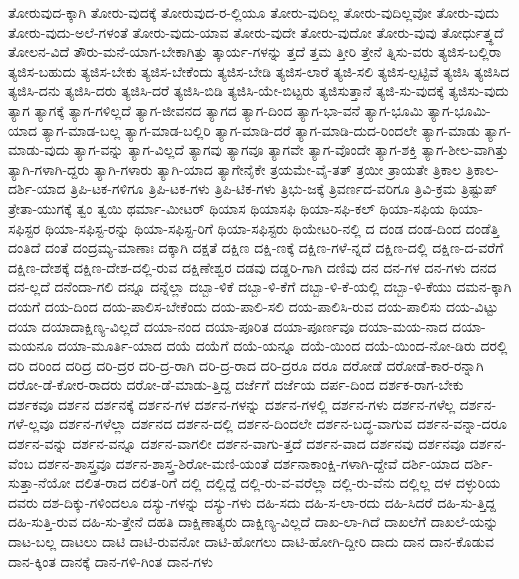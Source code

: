 {ತೋರುವುದ-ಕ್ಕಾಗಿ
ತೋರು-ವುದಕ್ಕೆ
ತೋರುವುದ-ರ-ಲ್ಲಿಯೂ
ತೋರು-ವುದಿಲ್ಲ
ತೋರು-ವುದಿಲ್ಲವೋ
ತೋರು-ವುದು
ತೋರು-ವುದು-ಅಲೆ-ಗಳಂತೆ
ತೋರು-ವುದು-ಯಾವ
ತೋರು-ವುದೇ
ತೋರು-ವುದೋ
ತೋರು-ವುವು
ತೋರ್ಧುತ್ತ್ಧದೆ
ತೋಲನ-ವಿದೆ
ತೌರು-ಮನೆ-ಯಾಗ-ಬೇಕಾಗಿತ್ತು
ತ್ಕಾರ್ಯ-ಗಳನ್ನು
ತ್ತದೆ
ತ್ತಮ
ತ್ತೀರಿ
ತ್ತೇನೆ
ತ್ನಿಸು-ವರು
ತ್ಯಜಿಸ-ಬಲ್ಲಿರಾ
ತ್ಯಜಿಸ-ಬಹುದು
ತ್ಯಜಿಸ-ಬೇಕು
ತ್ಯಜಿಸ-ಬೇಕೆಂದು
ತ್ಯಜಿಸ-ಬೇಡಿ
ತ್ಯಜಿಸ-ಲಾರೆ
ತ್ಯಜಿ-ಸಲಿ
ತ್ಯಜಿಸ-ಲ್ಪಟ್ಟಿವೆ
ತ್ಯಜಿಸಿ
ತ್ಯಜಿಸಿದ
ತ್ಯಜಿಸಿ-ದನು
ತ್ಯಜಿಸಿ-ದರು
ತ್ಯಜಿಸಿ-ದರೆ
ತ್ಯಜಿಸಿ-ಬಿಡಿ
ತ್ಯಜಿಸಿ-ಯೇ-ಬಿಟ್ಟರು
ತ್ಯಜಿಸುತ್ತಾನೆ
ತ್ಯಜಿ-ಸು-ವುದಕ್ಕೆ
ತ್ಯಜಿಸು-ವುದು
ತ್ಯಾಗ
ತ್ಯಾಗಕ್ಕೆ
ತ್ಯಾಗ-ಗಳಿಲ್ಲದೆ
ತ್ಯಾಗ-ಜೀವನದ
ತ್ಯಾಗದ
ತ್ಯಾಗ-ದಿಂದ
ತ್ಯಾಗ-ಭಾ-ವನೆ
ತ್ಯಾಗ-ಭೂಮಿ
ತ್ಯಾಗ-ಭೂಮಿ-ಯಾದ
ತ್ಯಾಗ-ಮಾಡ-ಬಲ್ಲ
ತ್ಯಾಗ-ಮಾಡ-ಬಲ್ಲಿರಿ
ತ್ಯಾಗ-ಮಾಡಿ-ದರೆ
ತ್ಯಾಗ-ಮಾಡಿ-ದುದ-ರಿಂದಲೇ
ತ್ಯಾಗ-ಮಾಡು
ತ್ಯಾಗ-ಮಾಡು-ವುದು
ತ್ಯಾಗ-ವನ್ನು
ತ್ಯಾಗ-ವಿಲ್ಲದೆ
ತ್ಯಾಗವು
ತ್ಯಾಗವೂ
ತ್ಯಾಗವೇ
ತ್ಯಾಗ-ವೊಂದೇ
ತ್ಯಾಗ-ಶಕ್ತಿ
ತ್ಯಾಗ-ಶೀಲ-ವಾಗಿತ್ತು
ತ್ಯಾಗಿ-ಗಳಾಗಿ-ದ್ದರು
ತ್ಯಾಗಿ-ಗಳಾರು
ತ್ಯಾಗಿ-ಯಾದ
ತ್ಯಾಗೇನೈಕೇ
ತ್ರಯಮೇ-ವೈ-ತತ್
ತ್ರಯೀ
ತ್ರಾಯತೇ
ತ್ರಿಕಾಲ
ತ್ರಿಕಾಲ-ದರ್ಶಿ-ಯಾದ
ತ್ರಿಪಿ-ಟಕ-ಗಳಿಗೂ
ತ್ರಿಪಿ-ಟಕ-ಗಳು
ತ್ರಿಪಿ-ಟಿಕ-ಗಳು
ತ್ರಿಭು-ಜಕ್ಕೆ
ತ್ರಿವರ್ಣದ-ವರಿಗೂ
ತ್ರಿವಿ-ಕ್ರಮ
ತ್ರಿಷ್ಟುಪ್
ತ್ರೇತಾ-ಯುಗಕ್ಕೆ
ತ್ವಂ
ತ್ವಯಿ
ಥರ್ಮಾ-ಮೀಟರ್
ಥಿಯಾಸ
ಥಿಯಾಸಫಿ
ಥಿಯಾ-ಸಫಿ-ಕಲ್
ಥಿಯಾ-ಸಫಿಯ
ಥಿಯಾ-ಸಫಿಸ್ಟರ
ಥಿಯಾ-ಸಫಿಸ್ಟ-ರನ್ನು
ಥಿಯಾ-ಸಫಿಸ್ಟ-ರಿಗೆ
ಥಿಯಾ-ಸಫಿಸ್ಟರು
ಥಿಯೇಟರಿ-ನಲ್ಲಿ
ದ
ದಂಡ
ದಂಡ-ದಿಂದ
ದಂಡೆತ್ತಿ
ದಂತಿದೆ
ದಂತೆ
ದಂದ್ರಮ್ಯ-ಮಾಣಾಃ
ದಕ್ಕಾಗಿ
ದಕ್ಷತೆ
ದಕ್ಷಿಣ
ದಕ್ಷಿ-ಣಕ್ಕೆ
ದಕ್ಷಿಣ-ಗಳೆ-ನ್ನದೆ
ದಕ್ಷಿಣ-ದಲ್ಲಿ
ದಕ್ಷಿಣ-ದ-ವರೆಗೆ
ದಕ್ಷಿಣ-ದೇಶಕ್ಕೆ
ದಕ್ಷಿಣ-ದೇಶ-ದಲ್ಲಿ-ರುವ
ದಕ್ಷಿಣೇಶ್ವರ
ದಡವು
ದಡ್ಡರಿ-ಗಾಗಿ
ದಣಿವು
ದನ
ದನ-ಗಳ
ದನ-ಗಳು
ದನದ
ದನ-ಲ್ಲದೆ
ದನೆಂದಾ-ಗಲಿ
ದನ್ನೂ
ದನ್ನೆಲ್ಲಾ
ದಬ್ಬಾ-ಳಿಕೆ
ದಬ್ಬಾ-ಳಿ-ಕೆಗೆ
ದಬ್ಬಾ-ಳಿ-ಕೆ-ಯಲ್ಲಿ
ದಬ್ಬಾ-ಳಿ-ಕೆಯು
ದಮನ-ಕ್ಕಾಗಿ
ದಯಗೆ
ದಯ-ದಿಂದ
ದಯ-ಪಾಲಿಸ-ಬೇಕೆಂದು
ದಯ-ಪಾಲಿ-ಸಲಿ
ದಯ-ಪಾಲಿಸಿ-ರುವ
ದಯ-ಪಾಲಿಸು
ದಯ-ವಿಟ್ಟು
ದಯಾ
ದಯಾದಾಕ್ಷಿಣ್ಯ-ವಿಲ್ಲದೆ
ದಯಾ-ನಂದ
ದಯಾ-ಪೂರಿತ
ದಯಾ-ಪೂರ್ಣವೂ
ದಯಾ-ಮಯ-ನಾದ
ದಯಾ-ಮಯನೂ
ದಯಾ-ಮೂರ್ತಿ-ಯಾದ
ದಯೆ
ದಯೆಗೆ
ದಯೆ-ಯನ್ನೂ
ದಯೆ-ಯಿಂದ
ದಯೆ-ಯಿಂದ-ನೋ-ಡಿರು
ದರಲ್ಲಿ
ದರಿ
ದರಿಂದ
ದರಿದ್ರ
ದರಿ-ದ್ರರ
ದರಿ-ದ್ರ-ರಾಗಿ
ದರಿ-ದ್ರ-ರಾದ
ದರಿ-ದ್ರರೂ
ದರೂ
ದರೋಡೆ
ದರೋಡೆ-ಕಾರ-ರನ್ನಾಗಿ
ದರೋ-ಡೆ-ಕೋರ-ರಾದರು
ದರೋ-ಡೆ-ಮಾಡು-ತ್ತಿದ್ದ
ದರ್ಜೆಗೆ
ದರ್ಜೆಯ
ದರ್ಪ-ದಿಂದ
ದರ್ಶಕ-ರಾಗ-ಬೇಕು
ದರ್ಶಕವೂ
ದರ್ಶನ
ದರ್ಶನಕ್ಕೆ
ದರ್ಶನ-ಗಳ
ದರ್ಶನ-ಗಳನ್ನು
ದರ್ಶನ-ಗಳಲ್ಲಿ
ದರ್ಶನ-ಗಳು
ದರ್ಶನ-ಗಳೆಲ್ಲ
ದರ್ಶನ-ಗಳೆ-ಲ್ಲವೂ
ದರ್ಶನ-ಗಳೆಲ್ಲಾ
ದರ್ಶನದ
ದರ್ಶನ-ದಲ್ಲಿ
ದರ್ಶನ-ದಿಂದಲೇ
ದರ್ಶನ-ಬದ್ಧ-ವಾಗುವ
ದರ್ಶನ-ವನ್ನಾ-ದರೂ
ದರ್ಶನ-ವನ್ನು
ದರ್ಶನ-ವನ್ನೂ
ದರ್ಶನ-ವಾಗಲೀ
ದರ್ಶನ-ವಾಗು-ತ್ತದೆ
ದರ್ಶನ-ವಾದ
ದರ್ಶನವು
ದರ್ಶನವೂ
ದರ್ಶನ-ವೆಂಬ
ದರ್ಶನ-ಶಾಸ್ತ್ರವೂ
ದರ್ಶನ-ಶಾಸ್ತ್ರ-ಶಿರೋ-ಮಣಿ-ಯಂತೆ
ದರ್ಶನಾಕಾಂಕ್ಷಿ-ಗಳಾಗಿ-ದ್ದೇವೆ
ದರ್ಶಿ-ಯಾದ
ದರ್ಶಿ-ಸುತ್ತಾ-ನೆಯೋ
ದಲಿತ-ರಾದ
ದಲಿತ-ರಿಗೆ
ದಲ್ಲಿ
ದಲ್ಲಿದ್ದೆ
ದಲ್ಲಿ-ರು-ವ-ವರೆಲ್ಲಾ
ದಲ್ಲಿ-ರು-ವೆನು
ದಲ್ಲಿಲ್ಲ
ದಳ
ದಳ್ಳುರಿಯ
ದವರು
ದಶ-ದಿಕ್ಕು-ಗಳಿಂದಲೂ
ದಸ್ಯು-ಗಳನ್ನು
ದಸ್ಯು-ಗಳು
ದಹಿ-ಸದು
ದಹಿ-ಸ-ಲಾ-ರದು
ದಹಿ-ಸಿದರೆ
ದಹಿ-ಸು-ತ್ತಿದ್ದ
ದಹಿ-ಸುತ್ತಿ-ರುವ
ದಹಿ-ಸು-ತ್ತೇನೆ
ದಹತಿ
ದಾಕ್ಷಿಣಾತ್ಯರು
ದಾಕ್ಷಿಣ್ಯ-ವಿಲ್ಲದೆ
ದಾಖ-ಲಾ-ಗಿದೆ
ದಾಖಲೆಗೆ
ದಾಖಲೆ-ಯನ್ನು
ದಾಟ-ಬಲ್ಲ
ದಾಟಲು
ದಾಟಿ
ದಾಟಿ-ರುವನೋ
ದಾಟಿ-ಹೋಗಲು
ದಾಟಿ-ಹೋಗಿ-ದ್ದೀರಿ
ದಾದು
ದಾನ
ದಾನ-ಕೊಡುವ
ದಾನ-ಕ್ಕಿಂತ
ದಾನಕ್ಕೆ
ದಾನ-ಗಳಿ-ಗಿಂತ
ದಾನ-ಗಳು
}
